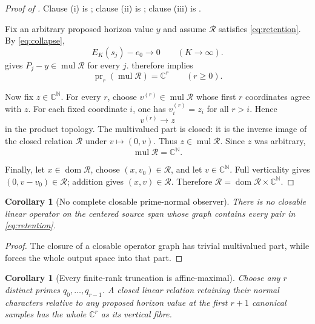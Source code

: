 \documentclass[11pt]{article}
\newtheorem{corollary}[theorem]{Corollary}
\theoremstyle{definition}
\theoremstyle{remark}
\newcommand{\C}{\mathbb C}
\newcommand{\N}{\mathbb N}
\newcommand{\cR}{\mathcal R}
\newcommand{\mul}{\operatorname{mul}}
\newcommand{\pr}{\operatorname{pr}}
\begin{document}
\begin{proof}[Proof of ]
Clause (i) is ; clause (ii) is
; clause (iii) is
.

Fix an arbitrary proposed horizon value \(y\) and assume \(\cR\) satisfies
\eqref{eq:retention}.  By
\eqref{eq:collapse},
\[
                    E_K(s_j)-e_0\longrightarrow0
                    \qquad(K\to\infty).
\]
 gives \(P_j-y\in\mul\cR\) for every \(j\).
 therefore implies
\[
                         \pr_r(\mul\cR)=\C^r
                         \qquad(r\geq0).
\tag{5.5}\label{eq:finite-surjectivity}
\]

Now fix \(z\in\C^\N\).  For every \(r\), choose
\(v^{(r)}\in\mul\cR\) whose first \(r\) coordinates agree with \(z\).
For each fixed coordinate \(i\), one has
\(v^{(r)}_i=z_i\) for all \(r>i\).  Hence
\[
                         v^{(r)}\longrightarrow z
\]
in the product topology.  The multivalued part is closed: it is the inverse
image of the closed relation \(\cR\) under \(v\mapsto(0,v)\).
Thus \(z\in\mul\cR\).  Since \(z\) was arbitrary,
\[
                              \mul\cR=\C^\N.
\]

Finally, let \(x\in\operatorname{dom}\cR\), choose
\((x,v_0)\in\cR\), and let \(v\in\C^\N\).  Full verticality gives
\((0,v-v_0)\in\cR\); addition gives \((x,v)\in\cR\).  Therefore
\(\cR=\operatorname{dom}\cR\times\C^\N\).
\end{proof}

\begin{corollary}[No complete closable prime-normal observer]
\label{cor:no-closable}
There is no closable linear operator on the centered source span whose graph
contains every pair in \eqref{eq:retention}.
\end{corollary}

\begin{proof}
The closure of a closable operator graph has trivial multivalued part, while
 forces the whole output space into that part.
\end{proof}

\begin{corollary}[Every finite-rank truncation is affine-maximal]
\label{cor:finite-maximal}
Choose any \(r\) distinct primes \(q_0,\ldots,q_{r-1}\).  A closed linear
relation retaining their normal characters relative to any proposed horizon
value at the first \(r+1\) canonical samples has the whole \(\C^r\) as its
vertical fibre.
\end{corollary}
\end{document}
